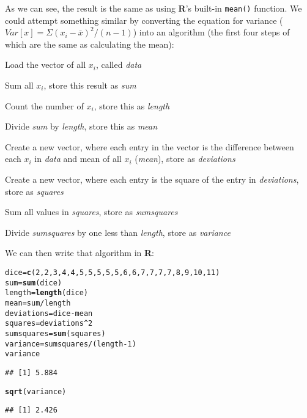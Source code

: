 \documentclass[12pt]{article}\usepackage[]{graphicx}\usepackage[]{color}
\makeatletter
\newcommand{\hlnum}[1]{\textcolor[rgb]{0.686,0.059,0.569}{#1}}%
\newcommand{\hlopt}[1]{\textcolor[rgb]{0,0,0}{#1}}%
\newcommand{\hlstd}[1]{\textcolor[rgb]{0.345,0.345,0.345}{#1}}%
\newcommand{\hlkwb}[1]{\textcolor[rgb]{0.69,0.353,0.396}{#1}}%
\newcommand{\hlkwd}[1]{\textcolor[rgb]{0.737,0.353,0.396}{\textbf{#1}}}%
\newenvironment{kframe}{%
 \def\at@end@of@kframe{}%
 \ifinner\ifhmode%
  \def\at@end@of@kframe{\end{minipage}}%
  \begin{minipage}{\columnwidth}%
 \fi\fi%
 \def\FrameCommand##1{\hskip\@totalleftmargin \hskip-\fboxsep
 \colorbox{shadecolor}{##1}\hskip-\fboxsep
     \hskip-\linewidth \hskip-\@totalleftmargin \hskip\columnwidth}%
 \MakeFramed {\advance\hsize-\width
   \@totalleftmargin\z@ \linewidth\hsize
   \@setminipage}}%
 {\par\unskip\endMakeFramed%
 \at@end@of@kframe}
\newenvironment{knitrout}{}{} %
\makeatother
\begin{document}
As we can see, the result is the same as using \textbf{R}'s built-in \verb|mean()| function. We could attempt something similar by converting the equation for variance ($Var[x]=\Sigma (x_{i} - \bar{x})^2 / (n-1)$) into an algorithm (the first four steps of which are the same as calculating the mean):
\begin{enumerate*}
\item Load the vector of all $x_i$, called \emph{data}
\item Sum all $x_i$, store this result as \emph{sum}
\item Count the number of $x_i$, store this as \emph{length}
\item Divide \emph{sum} by \emph{length}, store this as \emph{mean}
\item Create a new vector, where each entry in the vector is the difference between each $x_i$ in \emph{data} and mean of all $x_i$ (\emph{mean}),  store as \emph{deviations}
\item Create a new vector, where each entry is the square of the entry in \emph{deviations}, store as \emph{squares}
\item Sum all values in \emph{squares}, store as \emph{sumsquares}
\item Divide \emph{sumsquares} by one less than \emph{length}, store as \emph{variance}
\end{enumerate*}
We can then write that algorithm in \textbf{R}:
\begin{knitrout}
\color{fgcolor}\begin{kframe}
\begin{alltt}
\hlstd{dice} \hlkwb{=} \hlkwd{c}\hlstd{(}\hlnum{2}\hlstd{,} \hlnum{2}\hlstd{,} \hlnum{3}\hlstd{,} \hlnum{4}\hlstd{,} \hlnum{4}\hlstd{,} \hlnum{5}\hlstd{,} \hlnum{5}\hlstd{,} \hlnum{5}\hlstd{,} \hlnum{5}\hlstd{,} \hlnum{5}\hlstd{,} \hlnum{6}\hlstd{,} \hlnum{6}\hlstd{,} \hlnum{7}\hlstd{,} \hlnum{7}\hlstd{,} \hlnum{7}\hlstd{,} \hlnum{7}\hlstd{,} \hlnum{8}\hlstd{,} \hlnum{9}\hlstd{,} \hlnum{10}\hlstd{,} \hlnum{11}\hlstd{)}
\hlstd{sum} \hlkwb{=} \hlkwd{sum}\hlstd{(dice)}
\hlstd{length} \hlkwb{=} \hlkwd{length}\hlstd{(dice)}
\hlstd{mean} \hlkwb{=} \hlstd{sum}\hlopt{/}\hlstd{length}
\hlstd{deviations} \hlkwb{=} \hlstd{dice} \hlopt{-} \hlstd{mean}
\hlstd{squares} \hlkwb{=} \hlstd{deviations}\hlopt{^}\hlnum{2}
\hlstd{sumsquares} \hlkwb{=} \hlkwd{sum}\hlstd{(squares)}
\hlstd{variance} \hlkwb{=} \hlstd{sumsquares}\hlopt{/}\hlstd{(length} \hlopt{-} \hlnum{1}\hlstd{)}
\hlstd{variance}
\end{alltt}
\begin{verbatim}
## [1] 5.884
\end{verbatim}
\begin{alltt}
\hlkwd{sqrt}\hlstd{(variance)}
\end{alltt}
\begin{verbatim}
## [1] 2.426
\end{verbatim}
\end{kframe}
\end{knitrout}
\end{document}

